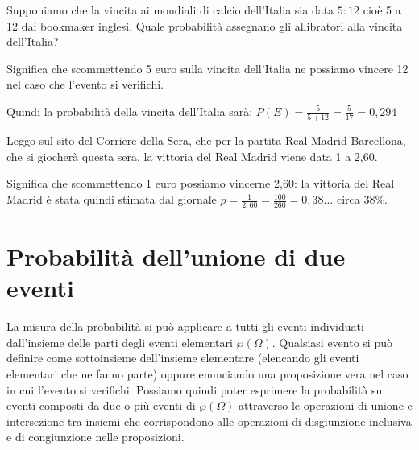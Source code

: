 \begin{esempio}
Supponiamo che la vincita ai mondiali di calcio dell'Italia sia data $5:12$ 
cioè 
5 a 12 dai bookmaker inglesi. Quale probabilità assegnano gli allibratori 
alla 
vincita dell'Italia?

Significa che scommettendo 5 euro sulla vincita dell'Italia ne possiamo 
vincere 
12 nel caso che l'evento si verifichi.

Quindi la probabilità della vincita dell'Italia sarà:
$P(E)=\frac 5{5+12}=\frac 5{17}=0,294$
\end{esempio}

\begin{esempio}
Leggo sul sito del Corriere della Sera, che per la partita Real 
Madrid-Barcellona, che si giocherà questa sera, la vittoria del Real Madrid 
viene data 1 a 2,60.

Significa che scommettendo 1 euro possiamo vincerne 2,60: la vittoria del 
Real 
Madrid è stata quindi stimata dal giornale $p=\frac 
1{2,60}=\frac{100}{260}=0,38\ldots$ circa 38\%.
\end{esempio}


\section{Probabilità dell'unione di due eventi}
\label{sec:09_unione}

La misura della probabilità si può applicare a tutti gli eventi individuati 
dall'insieme delle parti degli eventi elementari $\wp (\Omega )$. Qualsiasi 
evento si può definire come sottoinsieme dell'insieme elementare (elencando 
gli 
eventi elementari che ne fanno parte) oppure enunciando una proposizione 
vera 
nel caso in cui l'evento si verifichi. Possiamo quindi poter esprimere la 
probabilità su eventi composti da due o più eventi di $\wp (\Omega )$ 
attraverso 
le operazioni di unione e intersezione tra insiemi che corrispondono alle 
operazioni di disgiunzione inclusiva e di congiunzione nelle proposizioni.

